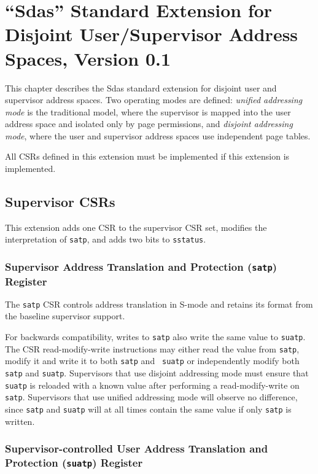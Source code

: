 \chapter{``Sdas'' Standard Extension for Disjoint User/Supervisor
  Address Spaces, Version 0.1}
\label{s:das}

This chapter describes the Sdas standard extension for disjoint user and
supervisor address spaces.  Two operating modes are defined: {\em unified
  addressing mode} is the traditional model, where the supervisor is mapped
into the user address space and isolated only by page permissions, and {\em
  disjoint addressing mode}, where the user and supervisor address spaces
use independent page tables.

All CSRs defined in this extension must be implemented if this extension is
implemented.

\section{Supervisor CSRs}

This extension adds one CSR to the supervisor CSR set, modifies the
interpretation of {\tt satp}, and adds two bits to {\tt sstatus}.

\subsection{Supervisor Address Translation and Protection ({\tt satp}) Register}
\label{s:das:satp}

The {\tt satp} CSR controls address translation in S-mode and retains its
format from the baseline supervisor support.

For backwards compatibility, writes to {\tt satp} also write the same value
to {\tt suatp}.  The CSR read-modify-write instructions may either read the
value from {\tt satp}, modify it and write it to both {\tt satp} and {\tt
  suatp} or independently modify both {\tt satp} and {\tt suatp}.
Supervisors that use disjoint addressing mode must ensure that {\tt suatp}
is reloaded with a known value after performing a read-modify-write on {\tt
  satp}.  Supervisors that use unified addressing mode will observe no
difference, since {\tt satp} and {\tt suatp} will at all times contain the
same value if only {\tt satp} is written.

\subsection{Supervisor-controlled User Address Translation and Protection
  ({\tt suatp}) Register}
\label{s:das:suatp}

